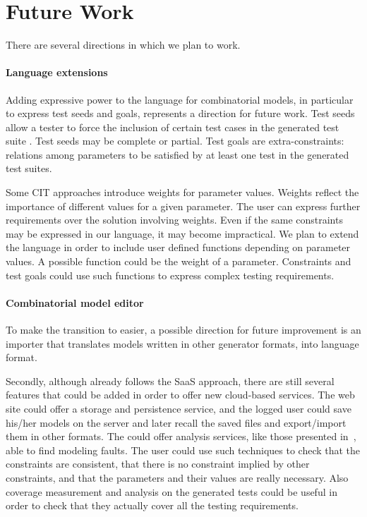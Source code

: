 \begin{tikzborder}{\cite{Gargantini16:validation}}
\begin{tikzborder}{\cite{gargantini_combinatorial_2017}}
\begin{tikzborder}{\cite{gargantini_combinatorial_2017}}
\begin{tikzborder}{\cite{garn2019}}
\begin{tikzborder}{\cite{arcaini2019achieving}}
\section{Future Work}\label{sec:futurework}

\begin{tikzborder}{}	
There are several directions in which we plan to work. 

\paragraph{Language extensions}
Adding expressive power to the language for combinatorial models, in particular to express test seeds and goals, represents a direction for future work.
Test seeds allow a tester to force the inclusion of certain test cases in the generated test suite \cite{BRYCE2006960}. Test seeds may be complete or partial. 
Test goals are extra-constraints: relations among parameters to be satisfied by at least one test in the generated test suites.

Some CIT approaches \cite{segall_using_2011} introduce weights for parameter values. Weights reflect the importance of different values for a given parameter. The user can express further requirements over the solution involving weights. Even if the same constraints may be expressed in our language, it may become impractical. We plan to extend the \ctwedge language in order to include user defined functions depending on parameter values. A possible function could be the weight of a parameter. Constraints and test goals could use such functions to express complex testing requirements.

\paragraph{Combinatorial model editor}
To make the transition to \ctwedge easier, a possible direction for future improvement is an importer that translates models written in other generator formats, into \ctwedge language format.

Secondly, although \ctwedge already follows the SaaS approach, there are still several features that could be added in order to offer new cloud-based services. 
The web site could offer a storage and persistence service, and the logged user could save his/her models on the \ctwedge server and later recall the saved files and export/import them in other formats.
The \ctwedge could offer analysis services, like those presented in~\cite{Arcaini2014}, able to find modeling faults. The user could use such techniques to check that the constraints are consistent, that there is no constraint implied by other constraints, and that the parameters and their values are really necessary. Also coverage measurement and analysis on the generated tests could be useful in order to check that they actually cover all the testing requirements. 


\end{tikzborder}
\end{tikzborder}
\end{tikzborder}
\end{tikzborder}
\end{tikzborder}
\end{tikzborder}
